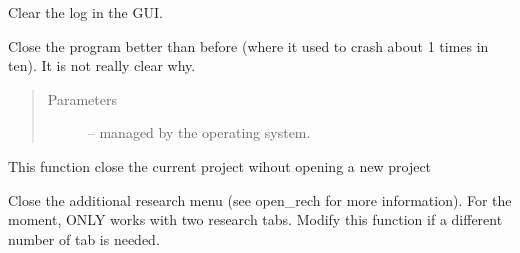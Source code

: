 \documentclass[letterpaper,10pt,english]{sphinxmanual}
\begin{document}
\begin{fulllineitems}
\begin{fulllineitems}
\end{fulllineitems}


\begin{fulllineitems}
\label{\detokenize{index:src_GUI.Main_windows_1.MainWindows.clear_log}}
Clear the log in the GUI.

\end{fulllineitems}


\begin{fulllineitems}
\label{\detokenize{index:src_GUI.Main_windows_1.MainWindows.closeEvent}}
Close the program better than before (where it used to crash about 1 times in ten). It is not really clear why.
\begin{quote}\begin{description}
\item[{Parameters}] \leavevmode
{} -- managed by the operating system.

\end{description}\end{quote}

\end{fulllineitems}


\begin{fulllineitems}
\label{\detokenize{index:src_GUI.Main_windows_1.MainWindows.close_project}}
This function close the current project wihout opening a new project

\end{fulllineitems}


\begin{fulllineitems}
\label{\detokenize{index:src_GUI.Main_windows_1.MainWindows.close_rech}}
Close the additional research menu (see open\_rech for more information). For the moment, ONLY works with
two research tabs. Modify this function if a different number of tab is needed.


\end{fulllineitems}
\end{fulllineitems}
\end{document}
